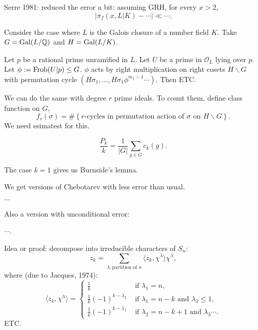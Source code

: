 \documentclass[reqno]{amsart} 
\begin{document}
Serre 1981: reduced the error a bit: assuming GRH, for every $x > 2$,
\begin{equation*}
  \left| \pi_f(x, L|K) - \dotsb \right| \ll \dotsb.
\end{equation*}

Consider the case where $L$ is the Galois closure of a number field $K$.  Take $G = \operatorname{Gal}(L / \mathbb{Q})$ and $H = \operatorname{Gal}(L/K)$.
\begin{theorem}[Frobenius]
  Let $p$ be a rational prime unramified in $L$.  Let $U$ be a prime in $\mathcal{O}_L$ lying over $p$.  Let $\phi := \operatorname{Frob}(U | p) \leq G$.  $\phi$ acts by right multiplication on right cosets $H \backslash G$ with permutation cycle $(H \sigma_1, \dotsc, H \sigma_1 \phi^{m_1 - 1} \dotsb)$.  Then ETC.
\end{theorem}

We can do the same with degree $r$ prime ideals.  To count them, define class function on $G$,
\begin{equation*}
  f_r(\sigma) = \# \left\{\text{$r$-cycles in permutation action of $\sigma$ on $H \backslash G$} \right\}.
\end{equation*}
We need esimatest for this.

\begin{theorem}[Parker]
  \begin{equation*}
    \frac{P_k}{k} = \frac{1}{\lvert G \rvert} \sum_{g \in G} c_k(g).
  \end{equation*}
\end{theorem}
The case $k = 1$ gives us Burnside's lemma.

We get versions of Chebotarev with less error than usual.

\begin{theorem}
  $\dotsb$
\end{theorem}

Also a version with unconditional error:
\begin{theorem}
  $\dotsb$.
\end{theorem}

Idea or proof: decompose into irreducible characters of $S_n$:
\begin{equation*}
  z_k = \sum_{\lambda : \text{partition of } n}
  \langle z_k, \chi^\lambda \rangle \chi^\lambda,
\end{equation*}
where (due to Jacques, 1974):
\begin{equation*}
  \langle z_k, \chi^\lambda \rangle
  =
  \begin{cases}
    \frac{1}{k}    & \text{ if } \lambda_1 = n, \\
    \frac{1}{k}(-1)^{k - \lambda_2}                   & \text{ if } \lambda_1 = n - k \text{ and } \lambda_3 \leq 1, \\
    \frac{1}{k}(- 1)^{k - \lambda_1}                   & \text{ if } \lambda_2 = n - k + 1 \text{ and } \lambda_3 \dotsb.
  \end{cases}
\end{equation*}
ETC.
\end{document}
